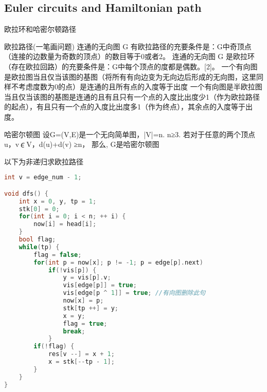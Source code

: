 \subsection{Euler circuits and Hamiltonian path}
    欧拉环和哈密尔顿路径

    欧拉路径(一笔画问题)
    连通的无向图 G 有欧拉路径的充要条件是：G中奇顶点（连接的边数量为奇数的顶点）的数目等于0或者2。
    连通的无向图 G 是欧拉环（存在欧拉回路）的充要条件是：G中每个顶点的度都是偶数。[2]。
    一个有向图是欧拉图当且仅当该图的基图（将所有有向边变为无向边后形成的无向图，这里同样不考虑度数为0的点）是连通的且所有点的入度等于出度
    一个有向图是半欧拉图当且仅当该图的基图是连通的且有且只有一个点的入度比出度少1（作为欧拉路径的起点），有且只有一个点的入度比出度多1（作为终点），其余点的入度等于出度。

    哈密尔顿图 
    设G=(V,E)是一个无向简单图，|V|=n.  n≥3. 
    若对于任意的两个顶点u，v∊V，d(u)+d(v) ≥n，
    那么, G是哈密尔顿图
    
    以下为非递归求欧拉路径
    \begin{lstlisting}[language=c++]
int v = edge_num - 1;

void dfs() {
    int x = 0, y, tp = 1;
    stk[0] = 0;
    for(int i = 0; i < n; ++ i) {
        now[i] = head[i];
    }
    bool flag;
    while(tp) {
        flag = false;
        for(int p = now[x]; p != -1; p = edge[p].next)
            if(!vis[p]) {
                y = vis[p].v;
                vis[edge[p]] = true;
                vis[edge[p ^ 1]] = true; //有向图删除此句
                now[x] = p;
                stk[tp ++] = y;
                x = y;
                flag = true;
                break;
            }
        if(!flag) {
            res[v --] = x + 1;
            x = stk[--tp - 1];
        }
    }
}
    \end{lstlisting}

